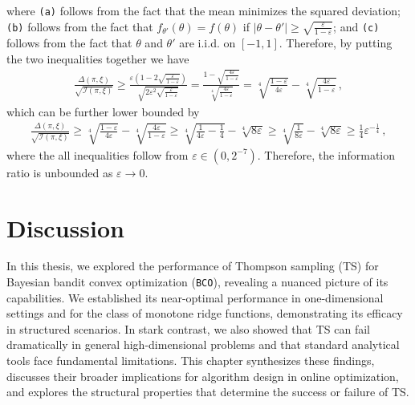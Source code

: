 \documentclass[letter, 12pt]{report}
\newcommand{\paren}[1]{\left( #1 \right)}
\newcommand{\I}{\mathcal{I}}
\newcommand{\1}{\mathbf{1}}
\newcommand{\bco}{\texttt{BCO}\xspace}
\newcommand{\ts}{\textsc{TS}\xspace}
\renewcommand{\epsilon}{\varepsilon}
\theoremstyle{plain}
\theoremstyle{definition}
\theoremstyle{remark}
\begin{document}
where \texttt{(a)} follows from the fact that the mean minimizes the squared deviation;
\texttt{(b)} follows from the fact that $f_{\theta'}(\theta) = f(\theta)$
if $|\theta - \theta'| \geq \sqrt{\frac{\epsilon}{1-\epsilon}}$;
and \texttt{(c)} follows from the fact that $\theta$ and $\theta'$ are i.i.d. on $[-1,1]$.
Therefore, by putting the two inequalities together we have
\begin{align*}
    \frac{
        \Delta(\pi, \xi)
    }{
        \sqrt{\I(\pi, \xi)}
    }
    \geq
    \frac{
        \epsilon \paren{1 - 2 \sqrt{\frac{\epsilon}{1-\epsilon}}}
    }{
        \sqrt{2 \epsilon^2\sqrt{\frac{\epsilon}{1-\epsilon}}}
    }
    =
    \frac{
        1 - \sqrt{\frac{4\epsilon}{1-\epsilon}}
    }{
        \sqrt[4]{\frac{4\epsilon}{1-\epsilon}}
    }
    =
    \sqrt[4]{\frac{1-\epsilon}{4\epsilon}}
    -
    \sqrt[4]{\frac{4\epsilon}{1-\epsilon}}\,,
\end{align*}
which can be further lower bounded by
\begin{align*}
    \frac{
        \Delta(\pi, \xi)
    }{
        \sqrt{\I(\pi, \xi)}
    }
    \geq
    \sqrt[4]{\frac{1-\epsilon}{4\epsilon}}
    -
    \sqrt[4]{\frac{4\epsilon}{1-\epsilon}}
    \geq
    \sqrt[4]{\frac{1}{4\epsilon} - \frac{1}{4}}
    -
    \sqrt[4]{8\epsilon}
    \geq
    \sqrt[4]{\frac{1}{8\epsilon}}
    -
    \sqrt[4]{8\epsilon}
    \geq
    \frac{1}{4}\epsilon^{-\frac14}\,,
\end{align*}
where the all inequalities follow from $\epsilon \in (0,2^{-7})$.
Therefore, the information ratio is unbounded as $\epsilon \to 0$.

\chapter{Discussion}
In this thesis, we explored the performance of Thompson sampling (\ts) for Bayesian bandit convex optimization (\bco), revealing a nuanced picture of its capabilities.
We established its near-optimal performance in one-dimensional
settings and for the class of monotone ridge functions,
demonstrating its efficacy in structured scenarios.
In stark contrast, we also showed that \ts can fail dramatically
in general high-dimensional problems and that standard analytical tools
face fundamental limitations.
This chapter synthesizes these findings, discusses their broader implications
for algorithm design in online optimization,
and explores the structural properties that determine the success or
failure of \ts.
\end{document}
